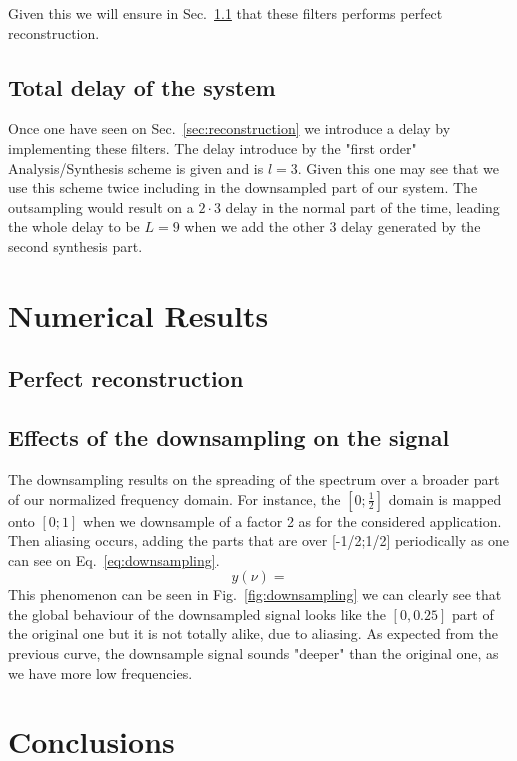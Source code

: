 \documentclass[a4paper,twocolumn]{article}
\begin{document}
Given this we will ensure in Sec.~\ref{sec:numreconstruction} that these filters performs perfect reconstruction.


\subsection{Total delay of the system}
Once one have seen on Sec.~\ref{sec:reconstruction} we introduce a delay by implementing these filters. The delay introduce by the "first order" Analysis/Synthesis scheme is given and is $l=3$. Given this one may see that we use this scheme twice including in the downsampled part of our system. The outsampling would result on a $2 \cdot 3$ delay in the normal part of the time, leading the whole delay to be $L=9$ when we add the other 3 delay generated by the second synthesis part.

\section{Numerical Results}
\label{sec:numerical}
\subsection{Perfect reconstruction}
\label{sec:numreconstruction}
\subsection{Effects of the downsampling on the signal}
The downsampling results on the spreading of the spectrum over a broader part of our normalized frequency domain. For instance, the $[0;\frac{1}{2}]$ domain is mapped onto $[0;1]$ when we downsample of a factor 2 as for the considered application. Then aliasing occurs, adding the parts that are over [-1/2;1/2] periodically as one can see on Eq.~\ref{eq:downsampling}. 
\begin{equation}
  \label{eq:downsampling}
y(\nu)=
\end{equation}
This phenomenon can be seen in Fig.~\ref{fig:downsampling} we can clearly see that the global behaviour of the downsampled signal looks like the $[0,0.25]$ part of the original one but it is not totally alike, due to aliasing. As expected from the previous curve, the downsample signal sounds "deeper" than the original one, as we have more low frequencies.

\section{Conclusions}
\label{sec:conclusions}
\end{document}
